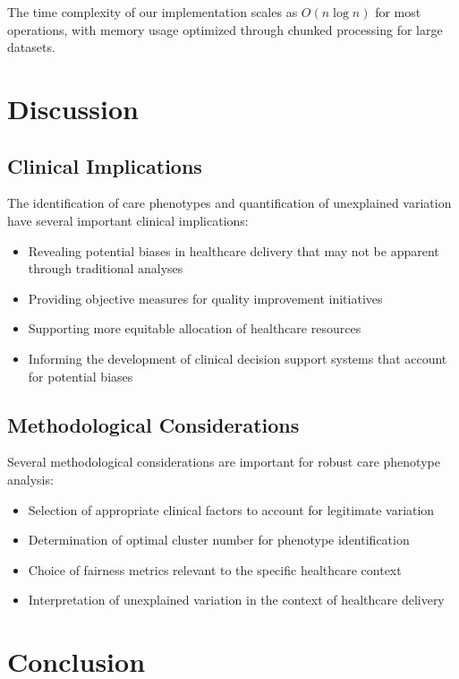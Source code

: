\documentclass[12pt]{article}
\begin{document}
The time complexity of our implementation scales as $O(n\log n)$ for most operations, with memory usage optimized through chunked processing for large datasets.

\section{Discussion}

\subsection{Clinical Implications}

The identification of care phenotypes and quantification of unexplained variation have several important clinical implications:

\begin{itemize}
    \item Revealing potential biases in healthcare delivery that may not be apparent through traditional analyses
    \item Providing objective measures for quality improvement initiatives
    \item Supporting more equitable allocation of healthcare resources
    \item Informing the development of clinical decision support systems that account for potential biases
\end{itemize}

\subsection{Methodological Considerations}

Several methodological considerations are important for robust care phenotype analysis:

\begin{itemize}
    \item Selection of appropriate clinical factors to account for legitimate variation
    \item Determination of optimal cluster number for phenotype identification
    \item Choice of fairness metrics relevant to the specific healthcare context
    \item Interpretation of unexplained variation in the context of healthcare delivery
\end{itemize}

\section{Conclusion}
\end{document}
